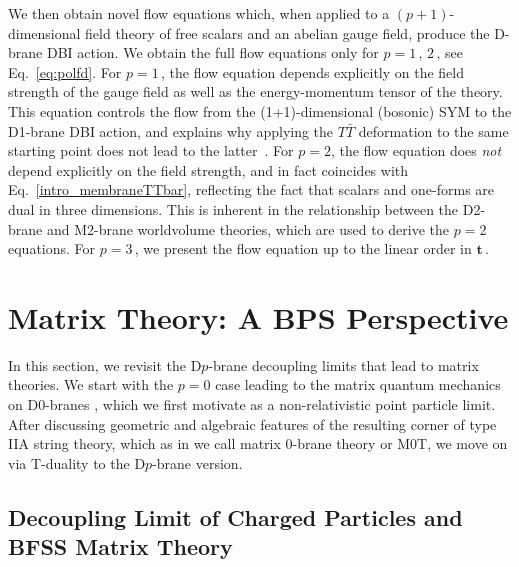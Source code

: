 \documentclass[11pt]{article}
\renewcommand{\emph}[1]{\textit{#1}}
\newcommand{\lambdap}{\boldsymbol{t}}
\begin{document}
We then obtain novel flow equations which, when applied to a $(p+1)$-dimensional field theory of free scalars and an abelian gauge field, produce the D-brane DBI action.
We obtain the full flow equations only 
for $p=1\,,\,2$\,, see Eq.~\eqref{eq:polfd}. 
For $p=1$\,, the flow equation depends explicitly on the field strength of the gauge field as well as the energy-momentum tensor of the theory. 
This equation controls the flow from the (1+1)-dimensional (bosonic) SYM to the D1-brane DBI action, and explains why applying the $T \bar T$ deformation to the same starting point does not lead to the latter~\cite{Conti:2018jho,Brennan:2019azg}.
For $p=2$, the flow equation does \emph{not} depend explicitly on the field strength, and in fact coincides with Eq.~\eqref{intro_membraneTTbar}, reflecting the fact that scalars and one-forms are dual in three dimensions. This is inherent in the relationship between the D2-brane and M2-brane worldvolume theories, which are used to derive the $p=2$ equations. For $p=3$\,, we present the flow equation up to the linear order in $\lambdap$\,. 



\section{Matrix Theory: A BPS Perspective}
\label{sec:MxThBPS} 

In this section, we revisit the D$p$-brane decoupling limits that lead to matrix theories.
We start with the $p=0$ case leading to the matrix quantum mechanics on D0-branes \cite{deWit:1988wri, Banks:1996vh,Susskind:1997cw}, which we first motivate as a non-relativistic point particle limit. 
After discussing geometric and algebraic features of the resulting corner of type IIA string theory, which as in \cite{Blair:2023noj} we call matrix 0-brane theory or M0T, we move on via T-duality to the D$p$-brane version. 

\subsection{Decoupling Limit of Charged Particles and BFSS Matrix Theory}
\label{sec:nonrelpp}
\end{document}
